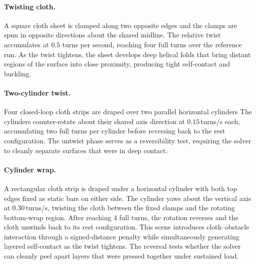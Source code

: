 \documentclass[acmtog,anonymous,review]{acmart}
\begin{document}
\paragraph{Twisting cloth.}
A square cloth sheet is clamped along two opposite edges 
and the clamps are spun in
opposite directions about the shared midline. The relative twist
accumulates at $0.5$ turns per second, reaching four full turns
over the reference run. 
As the twist tightens, the sheet develops deep helical folds that bring
distant regions of the surface into close proximity, producing
tight self-contact and buckling.

\paragraph{Two-cylinder twist.}
Four closed-loop cloth strips are draped over two
parallel horizontal cylinders The cylinders counter-rotate about their shared
axis direction at $0.15$\,turns/s each, accumulating two
full turns per cylinder
before reversing back to the rest configuration. The untwist
phase serves as a reversibility test, requiring the solver to cleanly
separate surfaces that were in deep contact.

\paragraph{Cylinder wrap.}
A rectangular cloth strip is draped under a horizontal cylinder
with both top edges fixed as static bars on either side.  The
cylinder yaws about the vertical axis at $0.30$\,turns/s, twisting the 
cloth between the fixed clamps and the rotating
bottom-wrap region.  
After reaching $4$ full turns, the rotation reverses and
the cloth unwinds back to its rest configuration. This scene
introduces cloth--obstacle interaction through a signed-distance
penalty while simultaneously generating layered self-contact as the
twist tightens. The reversal tests whether the solver can cleanly
peel apart layers that were pressed together under sustained load.
\end{document}
